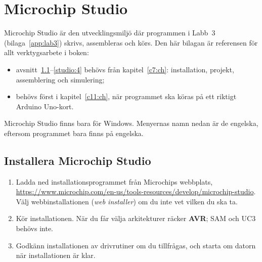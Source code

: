 %
%

\chapter{Microchip Studio}
\label{app:studio}

Microchip Studio är den utvecklingsmiljö där programmen i Labb~3 (bilaga~\ref{app:lab3}) skrivs,
assembleras och körs. Den här bilagan är referensen för allt verktygsarbete i boken:
\begin{itemize}
  \item avsnitt~\ref{studio:1}--\ref{studio:4} behövs från kapitel~\ref{c7:ch}: installation,
    projekt, assemblering och simulering;
  \item {} behövs först i kapitel~\ref{c11:ch}, när programmet ska köras på ett
    riktigt Arduino Uno-kort.
\end{itemize}

Microchip Studio finns bara för Windows. Menyernas namn nedan är de engelska, eftersom programmet
bara finns på engelska.

\section{Installera Microchip Studio}
\label{studio:1}
\begin{enumerate}
  \item Ladda ned installationsprogrammet från Microchips webbplats,
    \url{https://www.microchip.com/en-us/tools-resources/develop/microchip-studio}. Välj
    webbinstallationen (\emph{web installer}) om du inte vet vilken du ska ta.
  \item Kör installationen. När du får välja arkitekturer räcker \textbf{AVR}; SAM och UC3 behövs
    inte.
  \item Godkänn installationen av drivrutiner om du tillfrågas, och starta om datorn när
    installationen är klar.
\end{enumerate}

